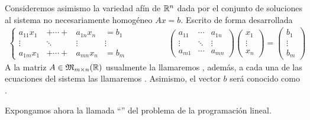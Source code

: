 Consideremos asimismo la variedad afín de $\mathbb{R}^n$ dada por el conjunto de soluciones al sistema no necesariamente homogéneo $Ax=b$. Escrito de forma desarrollada
\begin{equation*}
\begin{array}{cc}
\left\{\begin{array}{cccc}
a_{11}x_1&+\cdots+&a_{1n}x_n&=b_1\\
\vdots &\ddots &\vdots &\vdots\\
a_{1m}x_1&+\cdots+&a_{mn}x_n&=b_m
\end{array}\right.\qquad&\qquad\begin{pmatrix}
a_{11} & \cdots & a_{1n}\\
\vdots & \ddots & \vdots\\
a_{m1} & \cdots & a_{mn}
\end{pmatrix}\begin{pmatrix}
x_1\\
\vdots\\
x_n
\end{pmatrix}=\begin{pmatrix}
b_1\\
\vdots\\
b_m
\end{pmatrix}
\end{array}
\end{equation*}
A la matriz $A\in\mathfrak{M}_{m\times n}(\mathbb{R})$ usualmente la llamaremos , además, a cada una de las ecuaciones del sistema las llamaremos . Asimismo, el vector $b$ será conocido como .

Expongamos ahora la llamada ``'' del problema de la programación lineal.

